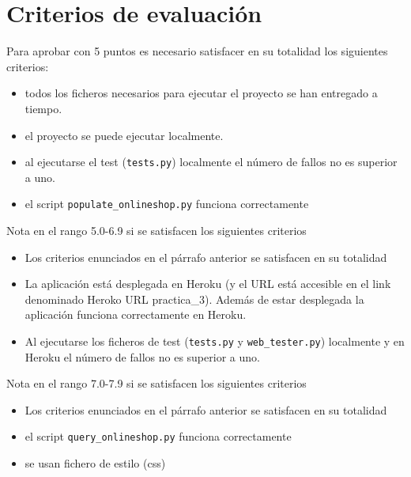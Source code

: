 \documentclass[12pt]{article} %
\newcommand{\ttt}[1]{\texttt{#1}}%
\begin{document}
\section{Criterios de evaluación}

Para aprobar con 5 puntos es necesario satisfacer en su totalidad los siguientes criterios:
\begin{itemize}
 \item todos los ficheros necesarios para ejecutar el proyecto se han entregado a tiempo.
 \item el proyecto se puede ejecutar localmente.
 \item al ejecutarse el test (\ttt{tests.py}) localmente el número de fallos no es superior a uno.
 \item el script \texttt{populate\_onlineshop.py} funciona correctamente
\end{itemize}
 
Nota en el rango 5.0-6.9 si se satisfacen los siguientes criterios
 \begin{itemize}
 \item Los criterios enunciados en el párrafo anterior se satisfacen en su totalidad 
 \item La aplicación está desplegada en Heroku (y el URL está accesible en el link denominado Heroko URL practica\_3). Además de estar desplegada la aplicación funciona correctamente en Heroku.
 \item Al ejecutarse los ficheros de test (\ttt{tests.py} y \ttt{web\_tester.py}) localmente y en Heroku el número de fallos no es superior a uno.
\end{itemize}
 
Nota en el rango 7.0-7.9 si se satisfacen los siguientes criterios
 \begin{itemize}
 \item Los criterios enunciados en el párrafo anterior se satisfacen en su totalidad 
 \item el script \texttt{query\_onlineshop.py} funciona correctamente
 \item se usan fichero de estilo (css)
 \end{itemize}
 
\end{document}
